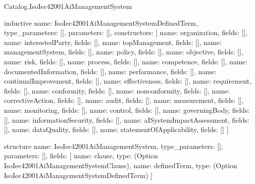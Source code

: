 \begin{lexlean}{Catalog.IsoIec42001AiManagementSystem}
\begin{semanticmodule}
inductive{
  name: IsoIec42001AiManagementSystemDefinedTerm,
  type_parameters: [],
  parameters: [],
  constructors: [
    {name: organization, fields: []},
    {name: interestedParty, fields: []},
    {name: topManagement, fields: []},
    {name: managementSystem, fields: []},
    {name: policy, fields: []},
    {name: objective, fields: []},
    {name: risk, fields: []},
    {name: process, fields: []},
    {name: competence, fields: []},
    {name: documentedInformation, fields: []},
    {name: performance, fields: []},
    {name: continualImprovement, fields: []},
    {name: effectiveness, fields: []},
    {name: requirement, fields: []},
    {name: conformity, fields: []},
    {name: nonconformity, fields: []},
    {name: correctiveAction, fields: []},
    {name: audit, fields: []},
    {name: measurement, fields: []},
    {name: monitoring, fields: []},
    {name: control, fields: []},
    {name: governingBody, fields: []},
    {name: informationSecurity, fields: []},
    {name: aISystemImpactAssessment, fields: []},
    {name: dataQuality, fields: []},
    {name: statementOfApplicability, fields: []}
  ]
}

structure{
  name: IsoIec42001AiManagementSystem,
  type_parameters: [],
  parameters: [],
  fields: [
    {name: clause, type: (Option IsoIec42001AiManagementSystemClause)},
    {name: definedTerm, type: (Option IsoIec42001AiManagementSystemDefinedTerm)}
  ]
}
\end{semanticmodule}
\end{lexlean}
